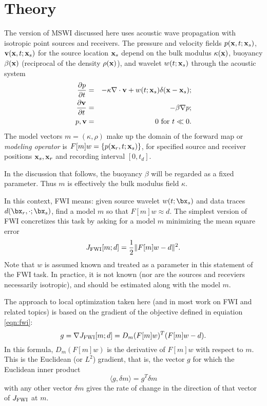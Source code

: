 \section{Theory}
The version of MSWI discussed here uses acoustic wave propagation with
isotropic point sources and receivers.
The pressure and velocity fields $p({\bf x},t;{\bf x}_s)$, ${\bf v}({\bf x},t;{\bf x}_s)$ for the source location ${\bf x}_s$ depend on the bulk modulus $\kappa({\bf x})$, buoyancy $\beta({\bf x})$ (reciprocal of the density $\rho({\bf x})$), and wavelet $w(t;{\bf x}_s)$ through the acoustic system
\begin{eqnarray}
  \label{eqn:awe}
 \frac{\partial p}{\partial t} & = &- \kappa \nabla \cdot {\bf v} +
w(t;{\bf x}_s) \delta({\bf x}-{\bf x}_s); \nonumber \\
\frac{\partial {\bf v}}{\partial t} & = & - \beta \nabla p; \\ 
p, {\bf v} & = & 0 \mbox{ for }  t \ll 0.
\end{eqnarray}
The model vectors $m=(\kappa,\rho)$ make up the domain of the forward
map or {\em modeling operator} is $F[m]w = \{p({\bf x}_r,t;{\bf
  x}_s)\}$, for specified source and receiver positions ${\bf x}_s, {\bf x}_r$ and
recording interval $[0,t_d]$.

In the discussion that follows, the buoyancy $\beta$ will be regarded
as a fixed parameter. Thus $m$ is effectively the bulk modulus field $\kappa$.

In this context, FWI means: given source wavelet
$w(t;\bx_s)$ and data traces $d(\bx_r,\cdot;\bx_s)$, find a model $m$
so that $F[m]w \approx d$. The
simplest version of FWI concretizes this task by asking for a model
$m$ minimizing the mean square error
\begin{equation}
  \label{eqn:fwi}
  J_{\rm FWI}[m;d]= \frac{1}{2}\|F[m]w-d\|^2.
\end{equation}
Note that $w$ is assumed known and treated as a parameter in this
statement of the FWI task. In practice, it is not known (nor are the
sources and receviers necessarily isotropic), and should be estimated
along with the model $m$.

The approach to local optimization taken here (and in most work on FWI
and related topics) is based on the gradient of the objective defined
in equiation \ref{eqn:fwi}:
\begin{equation}
  \label{eqn:fwigrad}
  g = \nabla  J_{\rm FWI}[m;d] = D_m(F[m]w)^T(F[m]w-d).
\end{equation}
In this formula, $D_m(F[m]w)$ is the derivative of $F[m]w$ with
respect to $m$. 
This is the Euclidean (or $L^2$) gradient, that is, the vector $g$ for
which the Euclidean inner product
\begin{equation}
  \label{eqn:eucip}
  \langle g, \delta m\rangle = g^T\delta m
\end{equation}
with any other vector $\delta m$ gives the
rate of change in the direction of that vector of $J_{\rm FWI}$ at $m$.

